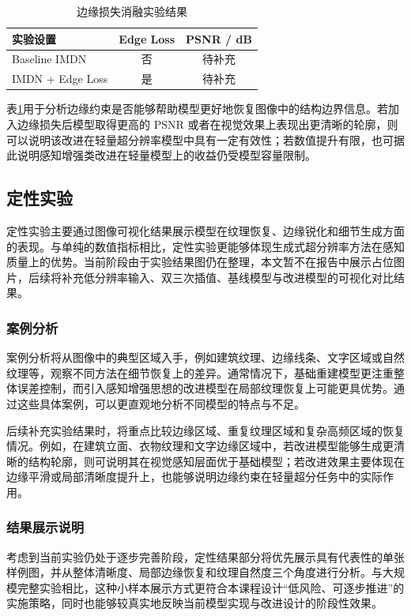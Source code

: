 \documentclass[bwprint]{report}
\begin{document}
\begin{table}[!htbp]
    \caption{边缘损失消融实验结果}
    \label{tab:ablation-study}
    \centering
    \begin{tabular}{lcc}
        \toprule[1.5pt]
        实验设置 & Edge Loss & PSNR / dB \\
        \midrule[1pt]
        Baseline IMDN & 否 & 待补充 \\
        IMDN + Edge Loss & 是 & 待补充 \\
        \bottomrule[1.5pt]
    \end{tabular}
\end{table}

表\ref{tab:ablation-study}用于分析边缘约束是否能够帮助模型更好地恢复图像中的结构边界信息。若加入边缘损失后模型取得更高的 PSNR 或者在视觉效果上表现出更清晰的轮廓，则可以说明该改进在轻量超分辨率模型中具有一定有效性；若数值提升有限，也可据此说明感知增强类改进在轻量模型上的收益仍受模型容量限制。

\subsection{定性实验}
定性实验主要通过图像可视化结果展示模型在纹理恢复、边缘锐化和细节生成方面的表现。与单纯的数值指标相比，定性实验更能够体现生成式超分辨率方法在感知质量上的优势。当前阶段由于实验结果图仍在整理，本文暂不在报告中展示占位图片，后续将补充低分辨率输入、双三次插值、基线模型与改进模型的可视化对比结果。

\subsubsection{案例分析}
案例分析将从图像中的典型区域入手，例如建筑纹理、边缘线条、文字区域或自然纹理等，观察不同方法在细节恢复上的差异。通常情况下，基础重建模型更注重整体误差控制，而引入感知增强思想的改进模型在局部纹理恢复上可能更具优势。通过这些具体案例，可以更直观地分析不同模型的特点与不足。

后续补充实验结果时，将重点比较边缘区域、重复纹理区域和复杂高频区域的恢复情况。例如，在建筑立面、衣物纹理和文字边缘区域中，若改进模型能够生成更清晰的结构轮廓，则可说明其在视觉感知层面优于基础模型；若改进效果主要体现在边缘平滑或局部清晰度提升上，也能够说明边缘约束在轻量超分任务中的实际作用。

\subsubsection{结果展示说明}
考虑到当前实验仍处于逐步完善阶段，定性结果部分将优先展示具有代表性的单张样例图，并从整体清晰度、局部边缘恢复和纹理自然度三个角度进行分析。与大规模完整实验相比，这种小样本展示方式更符合本课程设计“低风险、可逐步推进”的实施策略，同时也能够较真实地反映当前模型实现与改进设计的阶段性效果。
\end{document}
